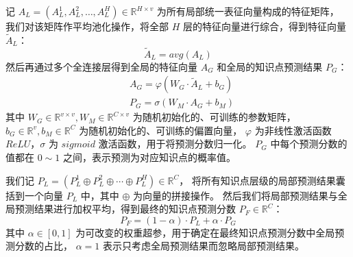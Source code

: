     记 $A_L = \left(A_L^1, A_L^2, \dots, A_L^H\right) \in \mathbb{R}^{H \times v}$ 为所有局部统一表征向量构成的特征矩阵，
    我们对该矩阵作平均池化操作，将全部 $H$ 层的特征向量进行综合，得到特征向量 $\tilde{A}_L$：
    \begin{equation}
        \tilde{A}_L = avg(A_L)
    \end{equation}
    然后再通过多个全连接层得到全局的特征向量 $A_G$ 和全局的知识点预测结果 $P_G$：
    \begin{equation}
        \begin{aligned}
            &A_G = \varphi\left(W_G \cdot \tilde{A}_L + b_G\right) \\
            &P_G = \sigma\left(W_M \cdot A_G + b_M\right)
        \end{aligned}
    \end{equation}
    其中 $W_G \in \mathbb{R}^{v \times v}, W_M \in \mathbb{R}^{C \times v}$ 为随机初始化的、可训练的参数矩阵，
    $b_G \in \mathbb{R}^{v}, b_M \in \mathbb{R}^{C}$ 为随机初始化的、可训练的偏置向量，
    $\varphi$ 为非线性激活函数 $ReLU$，$\sigma$ 为 $sigmoid$ 激活函数，用于将预测分数归一化。
    $P_G$ 中每个预测分数的值都在 $0 \sim 1$ 之间，表示预测为对应知识点的概率值。

    我们记 $P_L = \left(P_L^1 \oplus P_L^2 \oplus \cdots \oplus P_L^H\right) \in \mathbb{R}^{C}$，
    将所有知识点层级的局部预测结果囊括到一个向量 $P_L$ 中，其中 $\oplus$ 为向量的拼接操作。
    然后我们将局部预测结果与全局预测结果进行加权平均，得到最终的知识点预测分数 $P_F \in \mathbb{R}^{C}$：
    \begin{equation}
        P_F = (1 - \alpha) \cdot P_L + \alpha \cdot P_G
    \end{equation}
    其中 $\alpha \in [0, 1]$ 为可改变的权重超参，用于确定在最终知识点预测分数中全局预测分数的占比，
    $\alpha = 1$ 表示只考虑全局预测结果而忽略局部预测结果。

